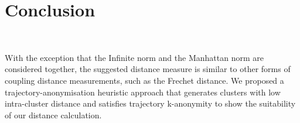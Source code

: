 \section{Conclusion }~\label{sec:conclusion}


With the exception that the Infinite norm and the Manhattan norm are considered together, the suggested distance measure is similar to other forms of coupling distance measurements, such as the Frechet distance. We proposed a trajectory-anonymisation heuristic approach that generates clusters with low intra-cluster distance and satisfies trajectory k-anonymity to show the suitability of our distance calculation.